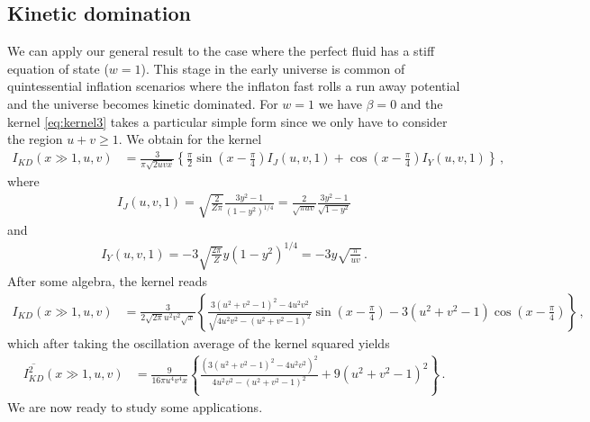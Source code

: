 \documentclass[aps,10pt,prd,groupedaddress,nofootinbib,notitlepage,eqsecnum,preprintnumbers]{revtex4-1}
\begin{document}
\subsection{Kinetic domination\label{subsec:KD}}
We can apply our general result to the case where the perfect fluid has a stiff equation of state ($w=1$). This stage in the early universe is common of quintessential inflation scenarios \cite{Wetterich:1987fm,Spokoiny:1993kt,Wetterich:1994bg,Peebles:1998qn,Brax:2005uf,Wetterich:2014gaa,Hossain:2014zma,Hossain:2014xha,Karananas:2016kyt,Agarwal:2017wxo,Geng:2017mic,Dimopoulos:2017zvq,Rubio:2017gty,Haro:2018zdb,GarciaBellido:2011de,Casas:2017wjh} where the inflaton fast rolls a run away potential and the universe becomes kinetic dominated. For $w=1$ we have $\beta=0$ and the kernel \eqref{eq:kernel3} takes a particular simple form since we only have to consider the region $u+v\geq 1$. We obtain for the kernel
\begin{align}
I_{KD}(x\gg 1,u,v)&=\frac{3}{\pi\sqrt{2uvx}}\left\{\frac{\pi}{2}\sin\left(x-\frac{\pi}{4}\right){I}_J(u,v,1)+\cos\left(x-\frac{\pi}{4}\right){I}_Y(u,v,1)\right\}\,,
\end{align}
where
\begin{align}
I_J(u,v,1)=\sqrt{\frac{2}{Z\pi}}\frac{3y^2-1}{(1-y^2)^{1/4}}=\frac{2}{\sqrt{\pi u v }}\frac{3y^2-1}{\sqrt{1-y^2}}
\end{align}
and
\begin{align}
I_Y(u,v,1)=-3\sqrt{\frac{2\pi}{Z}}y(1-y^2)^{1/4}=-3y\sqrt{\frac{\pi}{uv}}\,.
\end{align}
After some algebra, the kernel reads
\begin{align}
I_{KD}(x\gg1,u,v)&=\frac{3}{2\sqrt{2\pi}u^2v^2\sqrt{x}}\left\{\frac{3(u^2+v^2-1)^2-4u^2v^2}{\sqrt{4u^2v^2-(u^2+v^2-1)^2}}\sin\left(x-\frac{\pi}{4}\right)-3\left(u^2+v^2-1\right)\cos\left(x-\frac{\pi}{4}\right)\right\}\,,
\end{align}
which after taking the oscillation average of the kernel squared yields
\begin{align}\label{eq:kernelkination}
\overline{I_{KD}^2}(x\gg1,u,v)&=\frac{9}{16\pi u^4v^4x}\left\{\frac{\left(3(u^2+v^2-1)^2-4u^2v^2\right)^2}{{4u^2v^2-(u^2+v^2-1)^2}}+9\left(u^2+v^2-1\right)^2\right\}\,.
\end{align}
We are now ready to study some applications.
\end{document}
